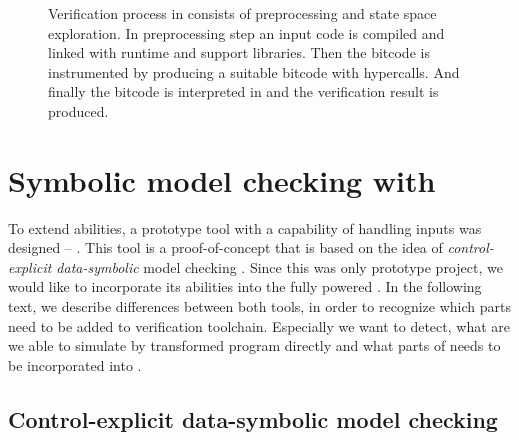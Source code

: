 \begin{figure}[!ht]
{
}
\caption{Verification process in \DIVINE consists of preprocessing and
state space exploration. In preprocessing step an input code is
compiled and linked with \DIOS runtime and \DIVINE support
libraries. Then the bitcode is instrumented by \LART producing a suitable \LLVM bitcode with \DIVM hypercalls. And finally the bitcode is interpreted in \DIVM and the verification result is produced.}\label{fig:verification}
\end{figure}

\section{Symbolic model checking with \SymDIVINE}\label{sub:symdivine}

To extend \DIVINE abilities, a prototype tool with a capability of handling inputs
was designed -- \SymDIVINE.  This tool is a proof-of-concept that is based on the
idea of \emph{control-explicit data-symbolic} model checking \cite{Barnat14}.
Since this was only prototype project, we would like to incorporate its
abilities into the fully powered \DIVINE. In the following text, we describe
differences between both tools, in order to recognize which parts need to be added
to \DIVINE verification toolchain. Especially we want to detect, what are we
able to simulate by transformed program directly and what parts of \SymDIVINE
needs to be incorporated into \DIVINE.

\subsection{Control-explicit data-symbolic model checking}

